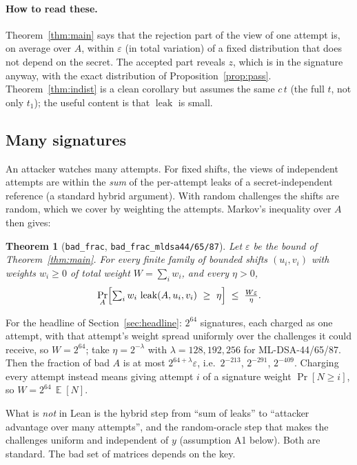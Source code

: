 \documentclass[11pt]{article}
\newtheorem{theorem}{Theorem}
\theoremstyle{definition}
\theoremstyle{remark}
\newcommand{\E}{\mathop{\mathbb{E}}}
\newcommand{\leak}{\operatorname{leak}}
\newcommand{\lean}[1]{\texttt{#1}}
\renewcommand{\Pr}{\mathop{\mathrm{Pr}}}
\begin{document}
\paragraph{How to read these.}
Theorem~\ref{thm:main} says that the rejection part of the view of one attempt is, on average over
$A$, within $\varepsilon$ (in total variation) of a fixed distribution that does not depend on the
secret. The accepted part reveals $z$, which is in the signature anyway, with the exact
distribution of Proposition~\ref{prop:pass}. Theorem~\ref{thm:indist} is a clean corollary but
assumes the same $c\,t$ (the full $t$, not only $t_1$); the useful content is that $\leak$ is small.

\subsection{Many signatures}\label{sec:many}

An attacker watches many attempts. For fixed shifts, the views of independent attempts are
within the \emph{sum} of the per-attempt leaks of a secret-independent reference (a standard
hybrid argument). With random challenges the shifts are random, which we cover by weighting the
attempts. Markov's inequality over $A$ then gives:

\begin{theorem}[\lean{bad\_frac}, \lean{bad\_frac\_mldsa44/65/87}]\label{thm:headline}
Let $\varepsilon$ be the bound of Theorem~\ref{thm:main}. For every finite family of bounded
shifts $(u_i,v_i)$ with weights $w_i\ge0$ of total weight $W=\sum_i w_i$, and every $\eta>0$,
\[
  \Pr_A\Bigl[\textstyle\sum_i w_i\,\leak(A,u_i,v_i)\ \ge\ \eta\Bigr] \;\le\; \frac{W\varepsilon}{\eta}.
\]
\end{theorem}

For the headline of Section~\ref{sec:headline}: $2^{64}$ signatures, each charged as one
attempt, with that attempt's weight spread uniformly over the challenges it could receive, so
$W=2^{64}$; take $\eta=2^{-\lambda}$ with $\lambda = 128, 192, 256$ for ML-DSA-44/65/87. Then the
fraction of bad $A$ is at most $2^{64+\lambda}\varepsilon$, i.e.\ $2^{-213}$, $2^{-291}$, $2^{-409}$. Charging every attempt instead
means giving attempt $i$ of a signature weight $\Pr[N\ge i]$, so $W=2^{64}\,\E[N]$.

What is \emph{not} in Lean is the hybrid step from ``sum of leaks'' to ``attacker advantage over
many attempts'', and the random-oracle step that makes the challenges uniform and independent of
$y$ (assumption A1 below). Both are standard. The bad set of matrices depends on the key.
\end{document}
